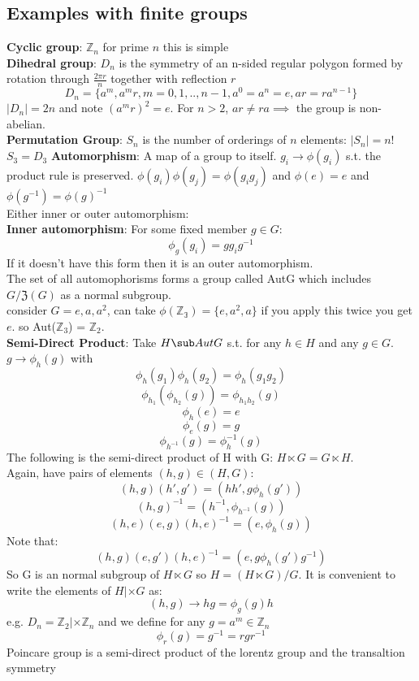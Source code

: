 \documentclass{article}
\begin{document}
{\subsection{Examples with finite groups}
\textbf{Cyclic group}: $\mathbb{Z}_n$ for prime $n$ this is simple\\
\textbf{Dihedral group}: $D_n$ is the symmetry of an n-sided regular polygon formed by rotation through $\frac{2\pi r}{n}$ together with reflection $r$\\
$$
D_n = \{a^m, a^mr, m = 0, 1,.., n-1, a^0 =a^n = e, ar = ra^{n-1}\}
$$
$|D_n| = 2n$ and note $(a^m r)^2 = e$. For $n>2$, $ar \neq ra \implies$ the group is non-abelian.\\
\textbf{Permutation Group}: $S_n$ is the number of orderings of $n$ elements: $|S_n| = n!$\\
$S_3 = D_3$
\textbf{Automorphism}: A map of a group to itself. $g_i \rightarrow \phi(g_i)$ s.t. the product rule is preserved. $\phi(g_i)\phi(g_j) = \phi(g_ig_j)$ and $\phi(e) = e$ and $\phi(g^{-1}) = \phi(g)^{-1}$\\
Either inner or outer automorphism:\\
\textbf{Inner automorphism}: For some fixed member $g \in G$:
$$
\phi_g(g_i) = gg_ig^{-1}
$$
If it doesn't have this form then it is an outer automorphism.\\ The set of all automophorisms forms a group called AutG which includes $G/\mathfrak{Z}(G)$ as a normal subgroup.\\
consider $G = {e, a, a^2}$, can take $\phi(\mathbb{Z_3}) = \{e,a^2,a\}$ if you apply this twice you get $e$. so Aut($\mathbb{Z}_3$) = $\mathbb{Z}_2$.\\
\textbf{Semi-Direct Product}: Take $H \sub AutG$ s.t. for any $h\in H$ and any $g \in G$.\\
$g \rightarrow \phi_h(g)$ with 
$$
\phi_h(g_1)\phi_h(g_2) = \phi_h(g_1g_2)
$$
$$
\phi_{h_1}(\phi_{h_2}(g)) = \phi_{h_{1}h_{2}}(g)
$$
$$
\phi_h(e) = e
$$
$$
\phi_e(g) = g
$$
$$
\phi_{h^{-1}}(g) = \phi_{h}^{-1}(g)
$$
The following is the semi-direct product of H with G: $H \ltimes G = G \ltimes H$.\\
Again, have pairs of elements $(h,g) \in (H,G)$:
$$
(h,g)(h',g') = (hh', g\phi_h(g'))
$$
$$
(h,g)^{-1} = (h^{-1}, \phi_{h^{-1}}(g))
$$
$$
(h,e)(e,g)(h,e)^{-1} = (e, \phi_h(g))
$$
Note that:
$$
(h,g)(e,g')(h,e)^{-1} = (e,g\phi_h(g')g^{-1})
$$
So G is an normal subgroup of $H\ltimes G$ so $H = (H\ltimes G)/G$. It is convenient to write the elements of $H|\times G$ as:
$$
(h,g) \rightarrow hg = \phi_g(g)h
$$
e.g. $D_n = \mathbb{Z}_2 |\times \mathbb{Z}_n$ and we define for any $g= a^m \in \mathbb{Z}_n$
$$
\phi_r(g) = g^{-1} =rgr^{-1}
$$
Poincare group is a semi-direct product of the lorentz group and the transaltion symmetry
}
\end{document}
